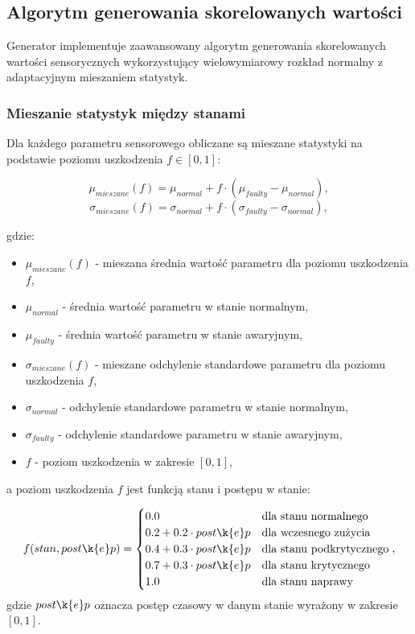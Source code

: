 \subsection{Algorytm generowania skorelowanych wartości}
\label{subsec:algorytm_generowania}

Generator implementuje zaawansowany algorytm generowania skorelowanych wartości sensorycznych wykorzystujący wielowymiarowy rozkład normalny z adaptacyjnym mieszaniem statystyk.

\subsubsection{Mieszanie statystyk między stanami}

Dla każdego parametru sensorowego obliczane są mieszane statystyki na podstawie poziomu uszkodzenia $f \in [0, 1]$:

\begin{equation}
\mu_{mieszane}(f) = \mu_{normal} + f \cdot (\mu_{faulty} - \mu_{normal}),
\end{equation}
\begin{equation}
\sigma_{mieszane}(f) = \sigma_{normal} + f \cdot (\sigma_{faulty} - \sigma_{normal}),
\end{equation}

gdzie:
\begin{itemize}
    \item $\mu_{mieszane}(f)$ - mieszana średnia wartość parametru dla poziomu uszkodzenia $f$,
    \item $\mu_{normal}$ - średnia wartość parametru w stanie normalnym,
    \item $\mu_{faulty}$ - średnia wartość parametru w stanie awaryjnym,
    \item $\sigma_{mieszane}(f)$ - mieszane odchylenie standardowe parametru dla poziomu uszkodzenia $f$,
    \item $\sigma_{normal}$ - odchylenie standardowe parametru w stanie normalnym,
    \item $\sigma_{faulty}$ - odchylenie standardowe parametru w stanie awaryjnym,
    \item $f$ - poziom uszkodzenia w zakresie $[0, 1]$,
\end{itemize}

a poziom uszkodzenia $f$ jest funkcją stanu i postępu w stanie:

\begin{equation}
f(stan, post\k{e}p) = \begin{cases}
0.0 & \text{dla stanu normalnego} \\
0.2 + 0.2 \cdot post\k{e}p & \text{dla wczesnego zu\.{z}ycia} \\
0.4 + 0.3 \cdot post\k{e}p & \text{dla stanu podkrytycznego} \\
0.7 + 0.3 \cdot post\k{e}p & \text{dla stanu krytycznego} \\
1.0 & \text{dla stanu naprawy}
\end{cases},
\end{equation}
gdzie $post\k{e}p$ oznacza postęp czasowy w danym stanie wyrażony w zakresie $[0, 1]$.

